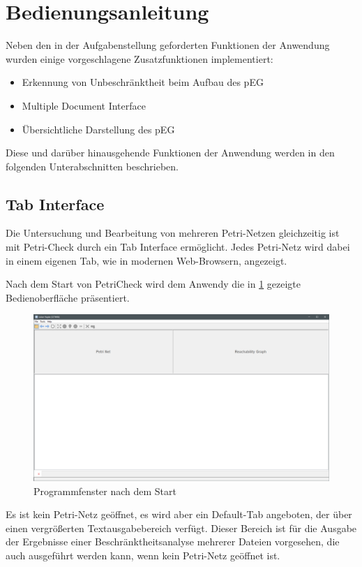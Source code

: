 \section{Bedienungsanleitung}
Neben den in der Aufgabenstellung geforderten Funktionen der Anwendung wurden
einige vorgeschlagene Zusatzfunktionen implementiert:
\begin{itemize}
  \item Erkennung von Unbeschränktheit beim Aufbau des pEG
  \item Multiple Document Interface
  \item Übersichtliche Darstellung des pEG
\end{itemize}
Diese und darüber hinausgehende Funktionen der Anwendung werden in den folgenden
Unterabschnitten beschrieben.

\subsection{Tab Interface}
Die Untersuchung und Bearbeitung von mehreren Petri-Netzen gleichzeitig ist mit
Petri-Check durch ein Tab Interface ermöglicht. Jedes Petri-Netz wird dabei in
einem eigenen Tab, wie in modernen Web-Browsern, angezeigt.

Nach dem Start von PetriCheck wird dem Anwendy die in \cref{img:default_window}
gezeigte Bedienoberfläche präsentiert.

\begin{figure}[ht]
  \includegraphics[width=\textwidth]{../img/default_window.png}
  \caption{Programmfenster nach dem Start}
  \label{img:default_window}
\end{figure}

Es ist kein Petri-Netz geöffnet, es wird aber ein Default-Tab angeboten, der
über einen vergrößerten Textausgabebereich verfügt. Dieser Bereich ist für die
Ausgabe der Ergebnisse einer Beschränktheitsanalyse mehrerer Dateien vorgesehen,
die auch ausgeführt werden kann, wenn kein Petri-Netz geöffnet ist.

